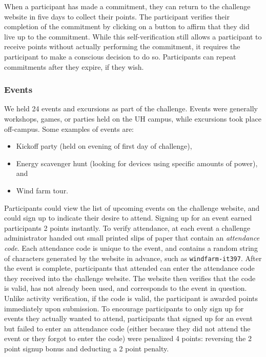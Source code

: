 When a participant has made a commitment, they can return to the challenge website in five days to collect their points. The participant verifies their completion of the commitment by clicking on a button to affirm that they did live up to the commitment. While this self-verification still allows a participant to receive points without actually performing the commitment, it requires the participant to make a conscious decision to do so. Participants can repeat commitments after they expire, if they wish.


\subsubsection{Events}
\label{sec:events}

We held 24 events and excursions as part of the challenge. Events were generally workshops, games, or parties held on the UH \Manoa campus, while excursions took place off-campus. Some examples of events are:

\begin{itemize}
	\item Kickoff party (held on evening of first day of challenge),
	\item Energy scavenger hunt (looking for devices using specific amounts of power), and
	\item Wind farm tour.
\end{itemize}

Participants could view the list of upcoming events on the challenge website, and could sign up to indicate their desire to attend. Signing up for an event earned participants 2 points instantly. To verify attendance, at each event a challenge administrator handed out small printed slips of paper that contain an \emph{attendance code}. Each attendance code is unique to the event, and contains a random string of characters generated by the website in advance, such as {\tt windfarm-it397}. After the event is complete, participants that attended can enter the attendance code they received into the challenge website. The website then verifies that the code is valid, has not already been used, and corresponds to the event in question. Unlike activity verification, if the code is valid, the participant is awarded points immediately upon submission. To encourage participants to only sign up for events they actually wanted to attend, participants that signed up for an event but failed to enter an attendance code (either because they did not attend the event or they forgot to enter the code) were penalized 4 points: reversing the 2 point signup bonus and deducting a 2 point penalty.


